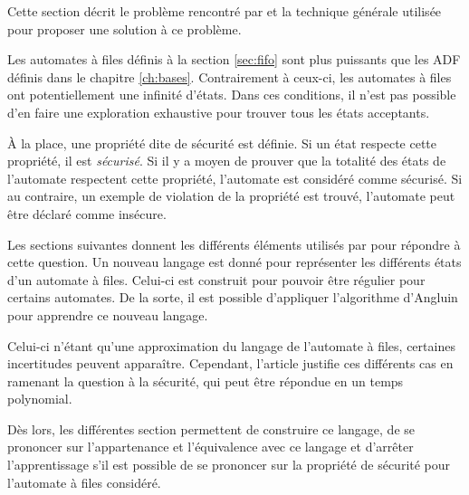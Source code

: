 Cette section décrit le problème rencontré par \cite{Vardhan04} et la technique générale utilisée pour proposer une solution à ce problème.

Les automates à files définis à la section \ref{sec:fifo} sont plus puissants que les ADF définis dans le chapitre \ref{ch:bases}. Contrairement à ceux-ci, les automates à files ont potentiellement une infinité d'états. Dans ces conditions, il n'est pas possible d'en faire une exploration exhaustive pour trouver tous les états acceptants.

À la place, une propriété dite de sécurité est définie. Si un état respecte cette propriété, il est \emph{sécurisé}. Si il y a moyen de prouver que la totalité des états de l'automate respectent cette propriété, l'automate est considéré comme sécurisé. Si au contraire, un exemple de violation de la propriété est trouvé, l'automate peut être déclaré comme insécure.

Les sections suivantes donnent les différents éléments utilisés par \cite{Vardhan04} pour répondre à cette question. Un nouveau langage est donné pour représenter les différents états d'un automate à files. Celui-ci est construit pour pouvoir être régulier pour certains automates. De la sorte, il est possible d'appliquer l'algorithme d'Angluin pour apprendre ce nouveau langage.

Celui-ci n'étant qu'une approximation du langage de l'automate à files, certaines incertitudes peuvent apparaître. Cependant, l'article justifie ces différents cas en ramenant la question à la sécurité, qui peut être répondue en un temps polynomial.

Dès lors, les différentes section permettent de construire ce langage, de se prononcer sur l'appartenance et l'équivalence avec ce langage et d'arrêter l'apprentissage s'il est possible de se prononcer sur la propriété de sécurité pour l'automate à files considéré.
